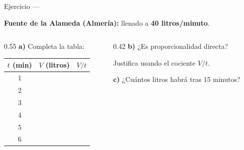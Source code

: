 \documentclass[aspectratio=169, 10pt, spanish]{beamer}
\begin{document}
\begin{frame}{Ejercicio — }
  \begin{comprenderbox}
    \textbf{Fuente de la Alameda (Almería):} llenado a \textbf{40 litros/minuto}.

    \vspace{0.3cm}
    \begin{columns}[t]
      \begin{column}{0.55\textwidth}
        \textbf{a)} Completa la tabla:
        \vspace{0.2cm}

        \renewcommand{\arraystretch}{1.2}
        \begin{tabular}{|c|c|c|}
          \hline
          \rowcolor{AlmAzulC!20}
          $t$ (min) & $V$ (litros) & $V/t$ \\
          \hline
          1 & \phantom{40}  & \phantom{40} \\
          2 & \phantom{80}  & \phantom{40} \\
          3 & \phantom{120} & \phantom{40} \\
          4 & \phantom{160} & \phantom{40} \\
          5 & \phantom{200} & \phantom{40} \\
          6 & \phantom{240} & \phantom{40} \\
          \hline
        \end{tabular}
      \end{column}
      \begin{column}{0.42\textwidth}
        \textbf{b)} ¿Es proporcionalidad directa?

        \vspace{0.3cm}
        Justifica usando el cociente $V/t$.

        \vspace{0.3cm}
        \textbf{c)} ¿Cuántos litros habrá tras 15 minutos?
      \end{column}
    \end{columns}
  \end{comprenderbox}
\end{frame}
\end{document}
